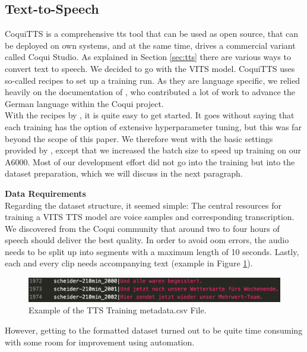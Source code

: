\documentclass[
  a4paper,  %
  twoside,  %
  bibliography=totoc,
  headsepline,
  cleardoublepage=empty,
  parskip=half,
  draft=false
]{scrbook}
\begin{document}
\subsection{Text-to-Speech}
CoquiTTS is a comprehensive \gls*{tts} tool that can be used as open source, that can be deployed on own systems, and at the same time, drives a commercial variant called Coqui Studio. As explained in Section \ref{sec:tts} there are various ways to convert text to speech. We decided to go with the VITS model. CoquiTTS uses so-called recipes to set up a training run. As they are language specific, we relied heavily on the documentation of \citet{mullerThorstenVoice2023}, who contributed a lot of work to advance the German language within the Coqui project. \\
With the recipes by , it is quite easy to get started. It goes without saying that each training has the option of extensive hyperparameter tuning, but this was far beyond the scope of this paper. We therefore went with the basic settings provided by , except that we increased the batch size to speed up training on our A6000. Most of our development effort did not go into the training but into the dataset preparation, which we will discuss in the next paragraph.

\textbf{Data Requirements} \\
Regarding the dataset structure, it seemed simple: The central resources for training a VITS TTS model are voice samples and corresponding transcription. We discovered from the Coqui community that around two to four hours of speech should deliver the best quality. In order to avoid \gls{oom} errors, the audio needs to be split up into segments with a maximum length of 10 seconds. Lastly, each and every clip needs accompanying text (example in Figure \ref{fig:metadata.csv}).

\begin{figure}[h]
  \centering
  \includegraphics[width=1\textwidth]{./graphics/tts/csv.png}
  \caption{Example of the TTS Training metadata.csv File.}
  \label{fig:metadata.csv}
\end{figure}

However, getting to the formatted dataset turned out to be quite time consuming with some room for improvement using automation.
\end{document}
